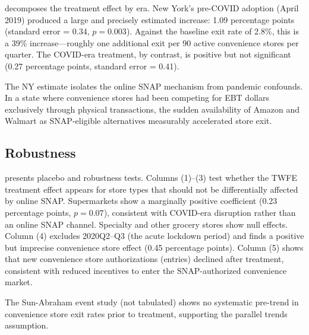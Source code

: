 \documentclass[12pt]{article}
\begin{document}
\begin{table}[H]
\centering
\begin{threeparttable}

\end{threeparttable}
\end{table}

 decomposes the treatment effect by era. New York's pre-COVID adoption (April 2019) produced a large and precisely estimated increase: 1.09 percentage points (standard error = 0.34, $p = 0.003$). Against the baseline exit rate of 2.8\%, this is a 39\% increase---roughly one additional exit per 90 active convenience stores per quarter. The COVID-era treatment, by contrast, is positive but not significant (0.27 percentage points, standard error = 0.41).

The NY estimate isolates the online SNAP mechanism from pandemic confounds. In a state where convenience stores had been competing for EBT dollars exclusively through physical transactions, the sudden availability of Amazon and Walmart as SNAP-eligible alternatives measurably accelerated store exit.

\subsection{Robustness}

\begin{table}[H]
\centering
\begin{threeparttable}

\end{threeparttable}
\end{table}

 presents placebo and robustness tests. Columns (1)--(3) test whether the TWFE treatment effect appears for store types that should not be differentially affected by online SNAP. Supermarkets show a marginally positive coefficient (0.23 percentage points, $p = 0.07$), consistent with COVID-era disruption rather than an online SNAP channel. Specialty and other grocery stores show null effects. Column (4) excludes 2020Q2--Q3 (the acute lockdown period) and finds a positive but imprecise convenience store effect (0.45 percentage points). Column (5) shows that new convenience store authorizations (entries) declined after treatment, consistent with reduced incentives to enter the SNAP-authorized convenience market.

The Sun-Abraham event study (not tabulated) shows no systematic pre-trend in convenience store exit rates prior to treatment, supporting the parallel trends assumption.
\end{document}
